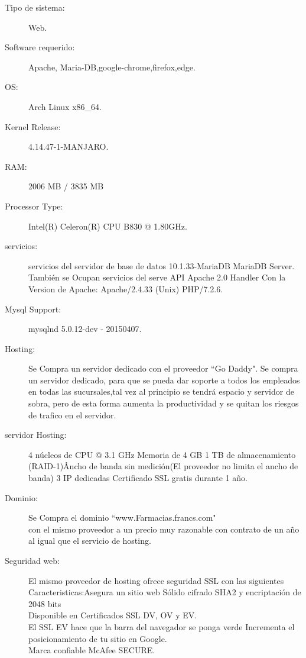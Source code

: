 \begin{description}

	\item[Tipo de sistema:] Web.
	\item[Software requerido:]Apache, Maria-DB,google-chrome,firefox,edge.
	\item[OS:] Arch Linux x86\_64.
	\item[Kernel Release:] 4.14.47-1-MANJARO.
	\item[RAM:] 2006 MB / 3835 MB
	\item[Processor Type:] Intel(R) Celeron(R) CPU B830 @ 1.80GHz.
	\item[servicios:] servicios del servidor de base de datos 10.1.33-MariaDB MariaDB Server.\\También se Ocupan servicios del serve API Apache 2.0 Handler
Con la Version de Apache:	Apache/2.4.33 (Unix) PHP/7.2.6.
	\item[Mysql Support:] mysqlnd 5.0.12-dev - 20150407.
	\item[Hosting:]Se Compra un servidor dedicado con el proveedor ``Go Daddy".
	Se compra un servidor dedicado, para que se pueda dar soporte a  todos los empleados en todas las sucursales,tal vez al principio se tendrá espacio y servidor de sobra, pero de esta forma aumenta la productividad y se quitan los riesgos de trafico en el servidor.
	\item[servidor Hosting:]4 núcleos de CPU @ 3.1 GHz
Memoria de 4 GB
1 TB de almacenamiento (RAID-1)\^
Ancho de banda sin medición(El proveedor no limita el ancho de banda) 
3 IP dedicadas
Certificado SSL gratis durante 1 año.
	\item[Dominio:] Se Compra el dominio ``www.Farmacias.francs.com"\\  con el mismo proveedor a un precio muy razonable con contrato de un año al igual que el servicio de hosting.
	\item[Seguridad web:]El mismo proveedor de hosting ofrece seguridad SSL
	con las siguientes Caracteristicas:Asegura un sitio web
Sólido cifrado SHA2 y encriptación de 2048 bits\\
Disponible en Certificados SSL DV, OV y EV.\\
El SSL EV hace que la barra del navegador se ponga verde 
Incrementa el posicionamiento de tu sitio en Google.\\
Marca confiable McAfee SECURE.\\
\end{description}
